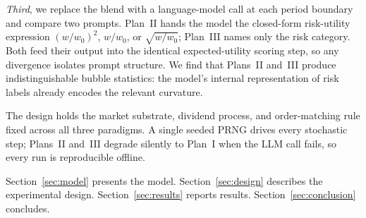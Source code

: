 \emph{Third}, we replace the blend with a language-model call at each
period boundary and compare two prompts.  Plan~II hands the model the
closed-form risk-utility expression $(w/w_0)^2$, $w/w_0$, or
$\sqrt{w/w_0}$; Plan~III names only the risk category.  Both feed
their output into the identical expected-utility scoring step, so any
divergence isolates prompt structure.  We find that Plans~II and~III
produce indistinguishable bubble statistics: the model's internal
representation of risk labels already encodes the relevant curvature.

The design holds the market substrate, dividend process, and
order-matching rule fixed across all three paradigms.  A single seeded
PRNG drives every stochastic step; Plans~II and~III degrade silently
to Plan~I when the LLM call fails, so every run is reproducible
offline.

Section~\ref{sec:model} presents the model.
Section~\ref{sec:design} describes the experimental design.
Section~\ref{sec:results} reports results.
Section~\ref{sec:conclusion} concludes.
